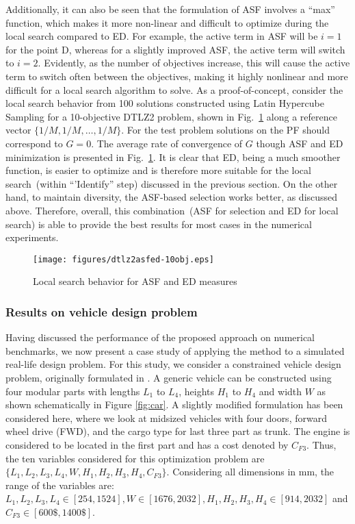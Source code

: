 Additionally, it can also be seen that the formulation of ASF involves a ``max'' function, which makes it more non-linear and difficult to optimize during the local search compared to ED. For example, the active term in ASF will be $i=1$ for the point D, whereas for a slightly improved ASF, the active term will switch to $i=2$. Evidently, as the number of objectives increase, this will cause the active term to switch often between the objectives, making it highly nonlinear and more difficult for a local search algorithm to solve. As a proof-of-concept, consider the local search behavior from 100 solutions constructed using Latin Hypercube Sampling for a 10-objective DTLZ2 problem, shown in Fig.~\ref{fig:asfedls} along a reference vector $\{1/M, 1/M, \ldots, 1/M\}$. For the test problem solutions on the PF should correspond to $G=0$. The average rate of convergence of $G$ though ASF and ED minimization is presented in Fig.~\ref{fig:asfedls}. It is clear that ED, being a much smoother function, is easier to optimize and is therefore more suitable for the local search~(within ``'Identify'' step) discussed in the previous section. On the other hand, to maintain diversity, the ASF-based selection works better, as discussed above. Therefore, overall, this combination~(ASF for selection and ED for local search) is able to provide the best results for most cases in the numerical experiments.     

\begin{figure}[!htb]
	\centering    
	\texttt{[image: figures/dtlz2asfed-10obj.eps]}   
	\caption{Local search behavior for ASF and ED measures}
	\label{fig:asfedls}
\end{figure}


\subsubsection{{\color{blue}Results on vehicle design problem}}
\label{subsubsec:KHTsubsubsec:3}

Having discussed the performance of the proposed approach on numerical benchmarks, we now present a case study of applying the method to a simulated real-life design problem. For this study, we consider a constrained {\color{blue}vehicle design} problem, originally formulated in \cite{KHTbarnum2010car}. A generic vehicle can be constructed using four modular parts with lengths $L_1$ to $L_4$, heights $H_1$ to $H_4$ and width $W$ as shown schematically in Figure \ref{fig:car}. A slightly modified formulation has been considered here, where we look at midsized vehicles with four doors, forward wheel drive (FWD), and the cargo type for last three part as trunk. The engine is considered to be located in the first part and has a cost denoted by $C_{F3}$. Thus, the ten variables considered for this optimization problem are $\{L_1, L_2, L_3, L_4, W, H_1, H_2, H_3, H_4, C_{F3}\}$. Considering all dimensions in mm, the range of the variables are: $L_1, L_2, L_3, L_4 \in [254,1524], W \in [1676,2032], H_1,H_2,H_3,H_4 \in [914,2032]$ and $C_{F3} \in [600\$,1400\$]$.

